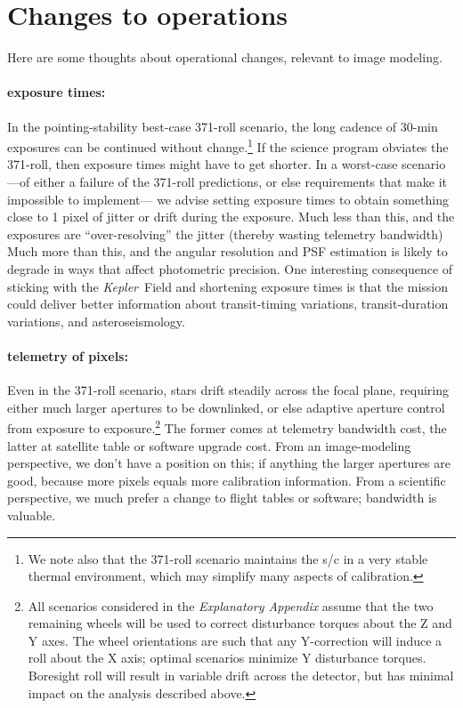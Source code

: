 \documentclass[letterpaper,12pt,whitepaper]{haastex}
\newcommand{\observatory}[1]{\textsl{#1}}
\newcommand{\Kepler}{\observatory{Kepler}}
\begin{document}


\section{Changes to operations}\label{sec:operations}

Here are some thoughts about operational changes, relevant to image
modeling.

\paragraph{exposure times:}
In the pointing-stability best-case 371-roll scenario,
  the long cadence of 30-min exposures can be continued without change.\footnote{We note also that the 371-roll scenario maintains the s/c in a very stable thermal environment, which may simplify many aspects of calibration.}
If the science program obviates the 371-roll,
  then exposure times might have to get shorter.
In a worst-case scenario%
  ---of either a failure of the 371-roll predictions,
  or else requirements that make it impossible to implement---%
  we advise setting exposure times to obtain something close to 1 pixel
  of jitter or drift during the exposure.
Much less than this, and the exposures are ``over-resolving'' the jitter
  (thereby wasting telemetry bandwidth)
Much more than this, and the angular resolution and PSF estimation is
  likely to degrade in ways that affect photometric precision.
One interesting consequence of sticking with the \Kepler~Field and shortening
  exposure times is that the mission could deliver better information
  about transit-timing variations, transit-duration variations, and asteroseismology.

\paragraph{telemetry of pixels:}
Even in the 371-roll scenario, stars drift steadily across the focal plane,
  requiring either much larger apertures to be downlinked,
  or else adaptive aperture control from exposure to exposure.\footnote{All scenarios considered in the \textit{Explanatory Appendix} assume that the two remaining wheels will be used to correct disturbance torques about the Z and Y axes.  The wheel orientations are such that any Y-correction will induce a roll about the X axis; optimal scenarios minimize Y disturbance torques.  Boresight roll will result in variable drift across the detector, but has minimal impact on the analysis described above.}
The former comes at telemetry bandwidth cost,
  the latter at satellite table or software upgrade cost.
From an image-modeling perspective, we don't have a position on this;
  if anything the larger apertures are good,
  because more pixels equals more calibration information.
From a scientific perspective, we much prefer a change to flight tables or software;
  bandwidth is valuable.
\end{document}
